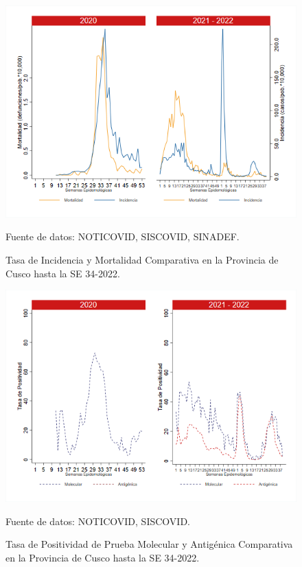 \documentclass[12pt,a4paper,openany]{book}
\begin{document}
	\begin{figure}[h]
		\caption{Tasa de Incidencia y Mortalidad Comparativa en la Provincia de Cusco hasta la SE 34-2022.}\label{fig:inc_mort_cusco}
		\begin{center}
			\includegraphics[width=0.85\linewidth]{../figuras/incidencia_mortalidad_20_21_7.png}
		\end{center}
		{\footnotesize {Fuente de datos: NOTICOVID, SISCOVID, SINADEF.}}
	\end{figure}
	
	\begin{figure}[h]
		\caption{Tasa de Positividad de Prueba Molecular y Antigénica Comparativa en la Provincia de Cusco hasta la SE 34-2022.}\label{fig:positividad_cusco}
		\begin{center}
			\includegraphics[width=0.7\linewidth]{../figuras/positividad_20_21_7.png}
		\end{center}
		{\footnotesize {Fuente de datos: NOTICOVID, SISCOVID.}}
	\end{figure}
	
\end{document}
